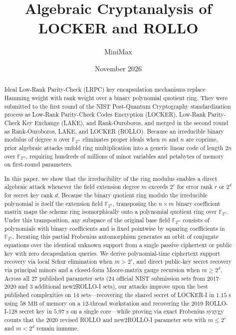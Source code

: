 \documentclass[11pt,a4paper]{article}
\title{\bfseries Algebraic Cryptanalysis of LOCKER and ROLLO}
\author{MiniMax}
\date{November 2026}
\theoremstyle{definition}
\theoremstyle{remark}
\newcommand{\F}{\mathbb{F}}
\begin{document}
\maketitle

\begin{abstract}
Ideal Low-Rank Parity-Check (LRPC) key encapsulation mechanisms replace Hamming weight with rank weight over a binary polynomial quotient ring. They were submitted to the first round of the NIST Post-Quantum Cryptography standardization process as Low-Rank Parity-Check Codes Encryption (LOCKER), Low-Rank Parity-Check Key Exchange (LAKE), and Rank-Ouroboros, and merged in the second round as Rank-Ouroboros, LAKE, and LOCKER (ROLLO). Because an irreducible binary modulus of degree $n$ over $\F_{2^m}$ eliminates proper ideals when $m$ and $n$ are coprime, prior algebraic attacks unfold ring multiplication into a generic linear code of length $2n$ over $\F_{2^m}$, requiring hundreds of millions of minor variables and petabytes of memory on first-round parameters.

In this paper, we show that the irreducibility of the ring modulus enables a direct algebraic attack whenever the field extension degree $m$ exceeds $2^r$ for error rank $r$ or $2^d$ for secret key rank $d$. Because the binary quotient ring modulo the irreducible polynomial is itself the extension field $\F_{2^n}$, transposing the $n \times m$ binary coefficient matrix maps the scheme ring isomorphically onto a polynomial quotient ring over $\F_{2^n}$. Under this transposition, any subspace of the original base field $\F_{2^m}$ consists of polynomials with binary coefficients and is fixed pointwise by squaring coefficients in $\F_{2^n}$. Iterating this partial Frobenius automorphism generates an orbit of conjugate equations over the identical unknown support from a single passive ciphertext or public key with zero decapsulation queries. We derive polynomial-time ciphertext support recovery via local Schur elimination when $m > 2^r$, and direct public-key secret recovery via principal minors and a closed-form Moore-matrix gauge recursion when $m \ge 2^d$. Across all $27$ published parameter sets ($24$ official NIST submission sets from 2017--2020 and $3$ additional new2ROLLO-I sets), our attacks improve upon the best published complexities on $14$ sets---recovering the shared secret of LOCKER-I in $1.15\text{ s}$ using $58\text{ MB}$ of memory on a $12$-thread workstation and recovering the $2019$ ROLLO-I-128 secret key in $5.97\text{ s}$ on a single core---while proving via exact Frobenius syzygy counts that the $2020$ revised ROLLO and new2ROLLO-I parameter sets with $m \le 2^r$ and $m < 2^d$ remain immune.
\end{abstract}
\end{document}
